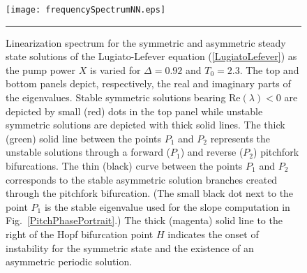 \begin{figure}[htb!]
\centering
\centerline{\texttt{[image: frequencySpectrumNN.eps]}}
  \rule{35em}{0.5pt}
\caption[LL Equation Linearization Spectrum for the Symmetric and Asymmetric 
Steady State Solutions]{Linearization spectrum for the symmetric and asymmetric 
steady state solutions of 
the Lugiato-Lefever equation (\ref{LugiatoLefever})
as the pump power $X$ is varied for $\Delta = 0.92$ and $T_0=2.3$.  
The top and bottom panels depict, respectively, the real and imaginary
parts of the eigenvalues.
%
Stable symmetric solutions bearing Re$(\lambda)<0$ are depicted by 
small (red) dots in the top panel while unstable symmetric solutions 
are depicted with thick solid lines.
%
The thick (green) solid line between the points $P_1$ and $P_2$ represents
the unstable solutions through a forward ($P_1$) and reverse ($P_2$)
pitchfork bifurcations.
%
The thin (black) curve between the points $P_1$ and $P_2$ corresponds to the 
stable asymmetric solution branches created through the pitchfork bifurcation.
(The small black dot next to the point $P_1$ is the stable eigenvalue
used for the slope computation in Fig.~\ref{PitchPhasePortrait}.)
%
The thick (magenta) solid line to the right of the Hopf bifurcation point
$H$ indicates the onset of instability for the symmetric state and the 
existence of an asymmetric periodic solution.
%
}
\label{fig:frequencySpectrum}
\end{figure}


